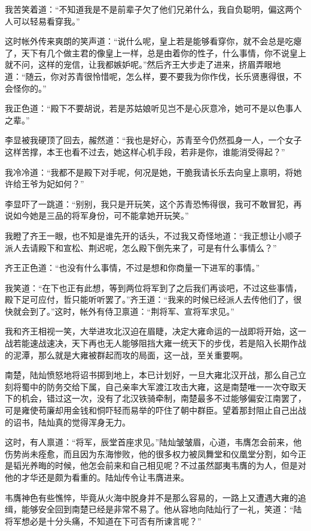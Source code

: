 我苦笑着道：“不知道我是不是前辈子欠了他们兄弟什么，我自负聪明，偏这两个人可以轻易看穿我。”

这时帐外传来爽朗的笑声道：“说什么呢，皇上若是能够看穿你，就不会总是吃瘪了，天下有几个做主君的像皇上一样，总是由着你的性子，什么事情，你不说皇上就不问，这样的宠信，让我都嫉妒呢。”然后齐王大步走了进来，挤眉弄眼地道：“随云，你对苏青很怜惜呢，怎么样，要不要我为你作伐，长乐贤惠得很，不会怪你的。”

我正色道：“殿下不要胡说，若是苏姑娘听见岂不是心灰意冷，她可不是以色事人之辈。”

李显被我硬顶了回去，赧然道：“我也是好心，苏青至今仍然孤身一人，一个女子这样苦撑，本王也看不过去，她这样心机手段，若非是你，谁能消受得起？”

我冷冷道：“我都不是殿下对手呢，何况是她，干脆我请长乐去向皇上禀明，将她许给王爷为妃如何？”

李显吓了一跳道：“别别，我只是开玩笑，这个苏青恐怖得很，我可不敢冒犯，再说如今她是三品的将军身份，可不能拿她开玩笑。”

我瞪了齐王一眼，也不知是谁先开的话头，不过我又奇怪地道：“我正想让小顺子派人去请殿下和宣松、荆迟呢，怎么殿下倒先来了，可是有什么事情么？”

齐王正色道：“也没有什么事情，不过是想和你商量一下进军的事情。”

我笑道：“在下也正有此想，等到两位将军到了之后我们再谈吧，不过这些事情，殿下足可应付，哲只能听听罢了。”齐王道：“我来的时候已经派人去传他们了，很快就会到了。”这时，帐外有侍卫禀道：“荆将军、宣将军求见。”

我和齐王相视一笑，大举进攻北汉迫在眉睫，决定大雍命运的一战即将开始，这一战若能速战速决，天下再也无人能够阻挡大雍一统天下的步伐，若是陷入长期作战的泥潭，那么就是大雍被群起而攻的局面，这一战，至关重要啊。

南楚，陆灿愤怒地将诏书掷到地上，本已计划好，一旦大雍北汉开战，那么自己立刻将蜀中的防务交给下属，自己亲率大军渡江攻击大雍，这是南楚唯一一次夺取天下的机会，错过这一次，没有了北汉铁骑牵制，南楚最多不过能够偏安江南罢了，可是雍使苟廉却用金钱和恫吓轻而易举的吓住了朝中群臣。望着那封阻止自己出战的诏书，陆灿真的觉得浑身无力。

这时，有人禀道：“将军，辰堂首座求见。”陆灿皱皱眉，心道，韦膺怎会前来，他伤势尚未痊愈，而且因为东海惨败，他的很多权力被凤舞堂和仪凰堂分割，如今正是韬光养晦的时候，他怎会前来和自己相见呢？不过虽然鄙夷韦膺的为人，但是对他的才华还是颇为看重的。陆灿传令让韦膺进来。

韦膺神色有些憔悴，毕竟从火海中脱身并不是那么容易的，一路上又遭遇大雍的追缉，能够安全回到南楚已经是非常不易了。他从容地向陆灿行了一礼，笑道：“陆将军想必是十分头痛，不知道在下可否有所谏言呢？”


